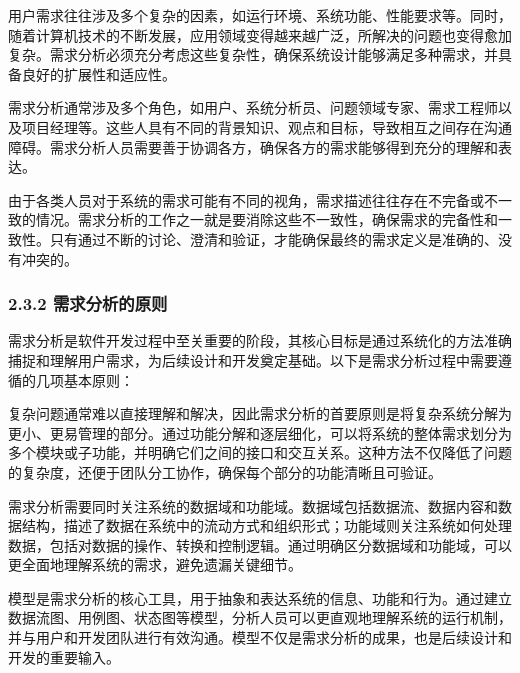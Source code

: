
用户需求往往涉及多个复杂的因素，如运行环境、系统功能、性能要求等。同时，随着计算机技术的不断发展，应用领域变得越来越广泛，所解决的问题也变得愈加复杂。需求分析必须充分考虑这些复杂性，确保系统设计能够满足多种需求，并具备良好的扩展性和适应性。


需求分析通常涉及多个角色，如用户、系统分析员、问题领域专家、需求工程师以及项目经理等。这些人具有不同的背景知识、观点和目标，导致相互之间存在沟通障碍。需求分析人员需要善于协调各方，确保各方的需求能够得到充分的理解和表达。


由于各类人员对于系统的需求可能有不同的视角，需求描述往往存在不完备或不一致的情况。需求分析的工作之一就是要消除这些不一致性，确保需求的完备性和一致性。只有通过不断的讨论、澄清和验证，才能确保最终的需求定义是准确的、没有冲突的。

\hypertarget{ux9700ux6c42ux5206ux6790ux7684ux539fux5219}{%
\subsubsection{2.3.2 需求分析的原则}\label{ux9700ux6c42ux5206ux6790ux7684ux539fux5219}}

需求分析是软件开发过程中至关重要的阶段，其核心目标是通过系统化的方法准确捕捉和理解用户需求，为后续设计和开发奠定基础。以下是需求分析过程中需要遵循的几项基本原则：


复杂问题通常难以直接理解和解决，因此需求分析的首要原则是将复杂系统分解为更小、更易管理的部分。通过功能分解和逐层细化，可以将系统的整体需求划分为多个模块或子功能，并明确它们之间的接口和交互关系。这种方法不仅降低了问题的复杂度，还便于团队分工协作，确保每个部分的功能清晰且可验证。


需求分析需要同时关注系统的数据域和功能域。数据域包括数据流、数据内容和数据结构，描述了数据在系统中的流动方式和组织形式；功能域则关注系统如何处理数据，包括对数据的操作、转换和控制逻辑。通过明确区分数据域和功能域，可以更全面地理解系统的需求，避免遗漏关键细节。


模型是需求分析的核心工具，用于抽象和表达系统的信息、功能和行为。通过建立数据流图、用例图、状态图等模型，分析人员可以更直观地理解系统的运行机制，并与用户和开发团队进行有效沟通。模型不仅是需求分析的成果，也是后续设计和开发的重要输入。

